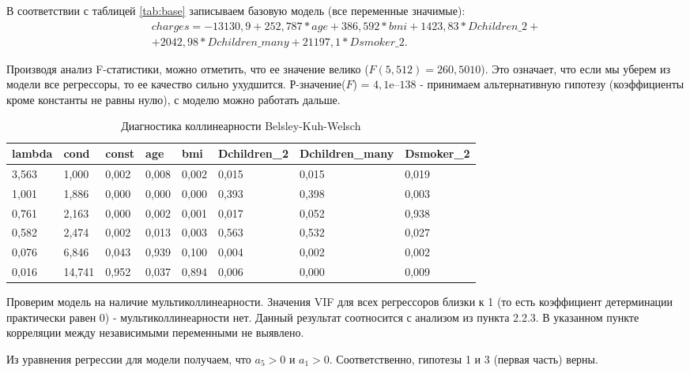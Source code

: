 \documentclass[a4paper,12pt]{article}
\begin{document}
В соответствии с таблицей \ref{tab:base} записываем базовую модель (все переменные значимые):
\begin{align*}
charges = -13130,9 + 252,787 * age + 386,592 * bmi + 1423,83 * Dchildren\_2 + \\ + 2042,98 * Dchildren\_many + 21197,1 * Dsmoker\_2.
\end{align*}

Производя анализ F-статистики, можно отметить, что ее значение велико ($F(5, 512) = 260,5010$). Это означает, что если мы уберем из модели все регрессоры, то ее качество сильно ухудшится. Р-значение($F$) = $4,1\textrm{e--138}$ - принимаем альтернативную гипотезу (коэффициенты кроме константы не равны нулю), с моделю можно работать дальше.

\begin{table}[H]
	\begin{tabular}{|l|l|l|l|l|l|l|l|}
		\hline
		lambda & cond   & const & age   & bmi   & Dchildren\_2 & Dchildren\_many & Dsmoker\_2 \\ \hline
		3,563  & 1,000  & 0,002 & 0,008 & 0,002 & 0,015        & 0,015           & 0,019      \\ \hline
		1,001  & 1,886  & 0,000 & 0,000 & 0,000 & 0,393        & 0,398           & 0,003      \\ \hline
		0,761  & 2,163  & 0,000 & 0,002 & 0,001 & 0,017        & 0,052           & 0,938      \\ \hline
		0,582  & 2,474  & 0,002 & 0,013 & 0,003 & 0,563        & 0,532           & 0,027      \\ \hline
		0,076  & 6,846  & 0,043 & 0,939 & 0,100 & 0,004        & 0,002           & 0,002      \\ \hline
		0,016  & 14,741 & 0,952 & 0,037 & 0,894 & 0,006        & 0,000           & 0,009      \\ \hline
	\end{tabular}
\caption{Диагностика коллинеарности Belsley-Kuh-Welsch}
\label{tab:base_bkw}
\end{table}

Проверим модель на наличие мультиколлинеарности. Значения VIF для всех регрессоров близки к 1 (то есть коэффициент детерминации практически равен 0) - мультиколлинеарности нет. Данный результат соотносится с анализом из пункта 2.2.3. В указанном пункте корреляции между независимыми переменными не выявлено.

Из уравнения регрессии для модели получаем, что $a_5 > 0$ и $a_1 > 0$. Соответственно, гипотезы 1 и 3 (первая часть) верны.
\end{document}
